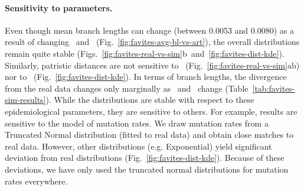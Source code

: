 \paragraph{Sensitivity to parameters.} Even though mean branch lengths can change (between 0.0053 and 0.0080) as a result of changing \EART\ and \ED\ (Fig.~\ref{fig:favites-avg-bl-vs-art}), the overall distributions remain quite stable (Figs.~\ref{fig:favites-real-vs-sim}b~and~\ref{fig:favites-dist-kde}). Similarly, patristic distances are not sensitive to \EART\ (Fig.~\ref{fig:favites-real-vs-sim}ab) nor to \ED\ (Fig.~\ref{fig:favites-dist-kde}). In terms of branch lengths, the divergence from the real data changes only marginally as \ED\ and \EART\ change (Table~\ref{tab:favites-sim-results}). While the distributions are stable with respect to these epidemiological parameters, they are sensitive to others. For example, results are sensitive to the model of mutation rates. We draw mutation rates from a Truncated Normal distribution (fitted to real data) and obtain close matches to real data. However, other distributions (e.g. Exponential) yield significant deviation from real distributions (Fig.~\ref{fig:favites-dist-kde}). Because of these deviations, we have only used the truncated normal distributions for mutation rates everywhere. 

